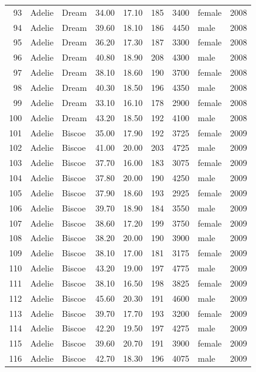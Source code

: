 \documentclass{article}\usepackage[]{graphicx}\usepackage[]{xcolor}
\begin{document}
\begin{table}[ht]
\begin{tabular}{rllrrrrlr}
  93 & Adelie & Dream & 34.00 & 17.10 & 185 & 3400 & female & 2008 \\ 
  94 & Adelie & Dream & 39.60 & 18.10 & 186 & 4450 & male & 2008 \\ 
  95 & Adelie & Dream & 36.20 & 17.30 & 187 & 3300 & female & 2008 \\ 
  96 & Adelie & Dream & 40.80 & 18.90 & 208 & 4300 & male & 2008 \\ 
  97 & Adelie & Dream & 38.10 & 18.60 & 190 & 3700 & female & 2008 \\ 
  98 & Adelie & Dream & 40.30 & 18.50 & 196 & 4350 & male & 2008 \\ 
  99 & Adelie & Dream & 33.10 & 16.10 & 178 & 2900 & female & 2008 \\ 
  100 & Adelie & Dream & 43.20 & 18.50 & 192 & 4100 & male & 2008 \\ 
  101 & Adelie & Biscoe & 35.00 & 17.90 & 192 & 3725 & female & 2009 \\ 
  102 & Adelie & Biscoe & 41.00 & 20.00 & 203 & 4725 & male & 2009 \\ 
  103 & Adelie & Biscoe & 37.70 & 16.00 & 183 & 3075 & female & 2009 \\ 
  104 & Adelie & Biscoe & 37.80 & 20.00 & 190 & 4250 & male & 2009 \\ 
  105 & Adelie & Biscoe & 37.90 & 18.60 & 193 & 2925 & female & 2009 \\ 
  106 & Adelie & Biscoe & 39.70 & 18.90 & 184 & 3550 & male & 2009 \\ 
  107 & Adelie & Biscoe & 38.60 & 17.20 & 199 & 3750 & female & 2009 \\ 
  108 & Adelie & Biscoe & 38.20 & 20.00 & 190 & 3900 & male & 2009 \\ 
  109 & Adelie & Biscoe & 38.10 & 17.00 & 181 & 3175 & female & 2009 \\ 
  110 & Adelie & Biscoe & 43.20 & 19.00 & 197 & 4775 & male & 2009 \\ 
  111 & Adelie & Biscoe & 38.10 & 16.50 & 198 & 3825 & female & 2009 \\ 
  112 & Adelie & Biscoe & 45.60 & 20.30 & 191 & 4600 & male & 2009 \\ 
  113 & Adelie & Biscoe & 39.70 & 17.70 & 193 & 3200 & female & 2009 \\ 
  114 & Adelie & Biscoe & 42.20 & 19.50 & 197 & 4275 & male & 2009 \\ 
  115 & Adelie & Biscoe & 39.60 & 20.70 & 191 & 3900 & female & 2009 \\ 
  116 & Adelie & Biscoe & 42.70 & 18.30 & 196 & 4075 & male & 2009 \\ 

\end{tabular}
\end{table}
\end{document}
